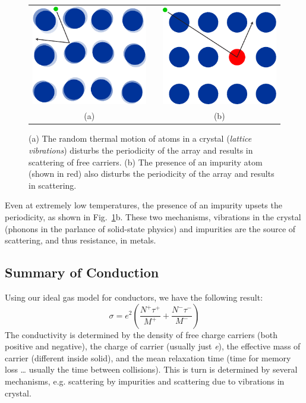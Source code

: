 \begin{figure}
\begin{center}
\begin{tabular}{ccc}
\includegraphics[width=.3\columnwidth]{lattice_vibrate} &
\hspace{.15\columnwidth} &
\includegraphics[width=.3\columnwidth]{lattice_impurity} \\
(a) & & (b) \\
\end{tabular}
\end{center}
\caption{(a) The random thermal motion of atoms in a crystal (\emph{lattice vibrations}) disturbs the periodicity of the array and results in scattering of free carriers.  (b) The presence of an impurity atom (shown in red) also disturbs the periodicity of the array and results in scattering.   } \label{fig:slide16}
\end{figure}


Even at extremely low temperatures, the presence of an impurity upsets the periodicity, as shown in Fig.~\ref{fig:slide16}b.  These two mechanisms, vibrations in the crystal (phonons in the parlance of solid-state physics) and impurities are the source of scattering, and thus resistance, in metals.





\subsection{Summary of Conduction}


Using our ideal gas model for conductors, we have the following result:
\begin{equation}
        \sigma  = {e^2}\left( {\frac{{{N^ + }{\tau ^ + }}}{{{M^ + }}} + \frac{{{N^ - }{\tau ^ - }}}{{{M^ - }}}} \right)
\end{equation}
The conductivity is determined by the density of free charge carriers (both positive and negative), the charge of carrier (usually just \textit{e}), the effective mass of carrier (different inside solid), and the mean relaxation time (time for memory loss … usually the time between collisions).   This is turn is determined by several mechanisms, e.g. scattering by impurities and scattering due to vibrations in crystal.



